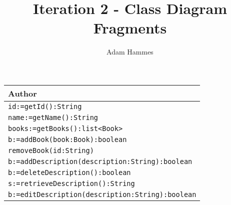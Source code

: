 \documentclass[12pt]{article}
\title{\vspace{1in}Iteration 2 - Class Diagram Fragments}
\author{Adam Hammes}
\begin{document}
\maketitle

\begin{tabular}{| l | }
  \hline
  Author\\
  \hline
  \texttt{id:=getId():String}\\
  \texttt{name:=getName():String}\\
  \texttt{books:=getBooks():list<Book>}\\
  \texttt{b:=addBook(book:Book):boolean}\\
  \texttt{removeBook(id:String)}\\
  \texttt{b:=addDescription(description:String):boolean}\\
  \texttt{b:=deleteDescription():boolean}\\
  \texttt{s:=retrieveDescription():String}\\
  \texttt{b:=editDescription(description:String):boolean}\\
  \hline
\end{tabular}

\vspace{1cm}
\end{document}
